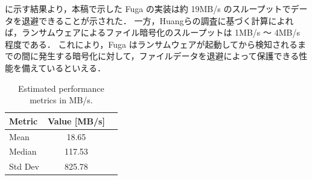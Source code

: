 に示す結果より，本稿で示した Fuga の実装は約 19MB/s のスループットでデータを退避できることが示された．
一方，Huangら\cite{huang2017flashguard}の調査に基づく計算によれば，ランサムウェアによるファイル暗号化のスループットは 1MB/s ～ 4MB/s 程度である．
これにより，Fuga はランサムウェアが起動してから検知されるまでの間に発生する暗号化に対して，ファイルデータを退避によって保護できる性能を備えているといえる．

\begin{table}[t]
  \centering
  \caption{Estimated performance metrics in MB/s.}
  \begin{tabular}{lcc}
    \hline
    Metric  & Value [MB/s] \\
    \hline
    Mean    & 18.65        \\
    Median  & 117.53       \\
    Std Dev & 825.78       \\
    \hline
  \end{tabular}
  \label{tab:performance_metrics}
\end{table}
